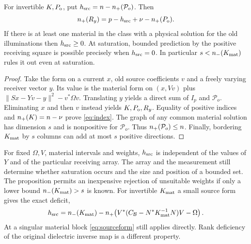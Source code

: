 \begin{proposition}\label{prop:sourceindex}
For invertible $K,P_{\mathrm o}$, put $h_{\rm src}=n-n_+(\mathcal P_o)$. Then
\begin{equation}
 n_+(R_y)=p-h_{\rm src}+\nu-n_+(P_{\mathrm o}).
 \label{eq:index}
\end{equation}
If there is at least one material in the class with a physical solution for the old illuminations then $h_{\rm src}\geq0$. At saturation, bounded prediction by the positive receiving square is possible precisely when $h_{\rm src}=0$. In particular $s<n_-(K_{\rm mat})$ rules it out even at saturation.
\end{proposition}
\begin{proof}
Take the form on a current $x$, old source coefficients $v$ and a freely varying receiver vector $y$. Its value is the material form on $(x,Vv)$ plus $\|Sx-Yv-y\|^2-v^*\Omega v$. Translating $y$ yields a direct sum of $I_p$ and $\mathcal P_o$. Eliminating $x$ and then $v$ instead yields $K,P_{\mathrm o},R_y$. Equality of positive indices and $n_+(K)=n-\nu$ prove \eqref{eq:index}. The graph of any common material solution has dimension $s$ and is nonpositive for $\mathcal P_o$. Thus $n_+(\mathcal P_o)\leq n$. Finally, bordering $K_{\rm mat}$ by $s$ columns can add at most $s$ positive directions.
\end{proof}
For fixed $\Omega,V$, material intervals and weights, $h_{\rm src}$ is independent of the values of $Y$ and of the particular receiving array. The array and the measurement still determine whether saturation occurs and the size and position of a bounded set. The proposition permits an inexpensive rejection of unsuitable weights if only a lower bound $n_-(K_{\rm mat})>s$ is known. For invertible $K_{\rm mat}$ a small source form gives the exact deficit,
\begin{equation}
 h_{\rm src}=n_-(K_{\rm mat})
 -n_+\!\left(V^*(C_{\mathcal B}-N^*K_{\rm mat}^{-1}N)V-\Omega\right).
 \label{eq:indexsmall}
\end{equation}
At a singular material block \eqref{eq:sourceform} still applies directly. Rank deficiency of the original dielectric inverse map is a different property.



